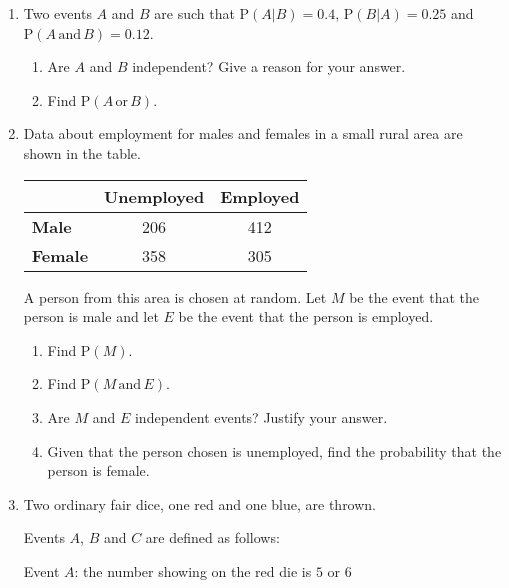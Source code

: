 \begin{enumerate}
\item Two events $A$ and $B$ are such that $\text{P}(A|B) =0.4$, $\text{P}(B|A) =0.25$ and $\text{P}(A \,\text{and} \, B) =0.12$.

\begin{enumerate}
	\item Are $A$ and $B$ independent? Give a reason for your answer.
	\item Find $\text{P}(A \,\text{or} \,B)$.
\end{enumerate}

\newpage 

\item Data about employment for males and females in a small rural area are shown in the table.



\begin{table}[!htpb]
	\centering
	\begin{tabular}{l|c|c|}
		\cline{2-3}
		& \textbf{Unemployed} & \textbf{Employed} \\ \hline
		\multicolumn{1}{|l|}{\textbf{Male}}   & 206                 & 412               \\ \hline
		\multicolumn{1}{|l|}{\textbf{Female}} & 358                 & 305               \\ \hline
	\end{tabular}
\end{table}




A person from this area is chosen at random. Let $M$ be the event that the person is male and let $E$ be the event that the person is employed.

\begin{enumerate}
	\item Find $\text{P}(M)$.
	\item Find $\text{P}(M\,\text{and}\, E)$.
	\item Are $M$ and $E$ independent events? Justify your answer.
	\item 	Given that the person chosen is unemployed, find the probability  that the person is female.
\end{enumerate}






\item Two ordinary fair dice, one red and one blue, are thrown.

Events $A$, $B$ and $C$ are defined as follows:

Event $A$: the number showing on the red die is $5$ or $6$


\end{enumerate}
